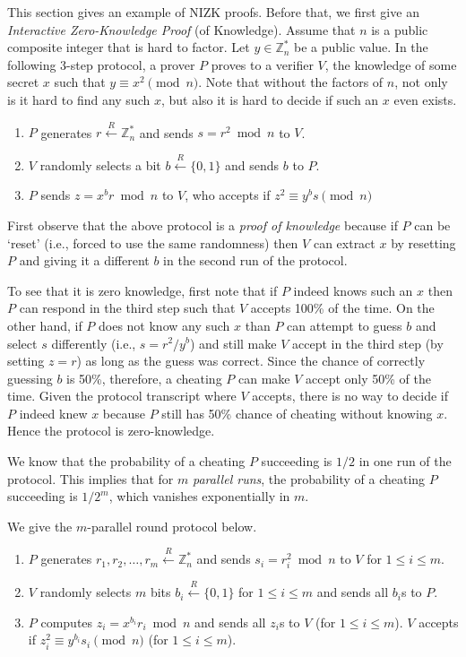 \documentclass[]{report}   %
\newcommand{\rand}{\stackrel{R}{\leftarrow}}
\begin{document}
This section gives an example of NIZK proofs. Before that, we first give an {\em Interactive Zero-Knowledge Proof} (of Knowledge). Assume that $n$ is a public composite integer that is hard to factor.
Let $y\in \mathbb{Z}^*_n$ be a public value. In the following 3-step protocol, a prover $P$ proves to a verifier $V$, the knowledge of some secret $x$ such that $y\equiv x^2 \pmod{n}$.
Note that without the factors of $n$, not only is it hard to find any such $x$, but also it is hard to decide if such an $x$ even exists. 

\begin{enumerate}
	\item $P$ generates $r\rand \mathbb{Z}^*_n$ and sends $s = r^2\bmod{n}$ to $V$.
	\item $V$ randomly selects a bit $b\rand \{0, 1\}$ and sends $b$ to $P$.
	\item $P$ sends $z=x^br \bmod{n}$ to $V$, who accepts if $z^2 \equiv y^bs\pmod{n}$
\end{enumerate}

First observe that the above protocol is a {\em proof of knowledge} because if $P$ can be `reset' (i.e., forced to use the same randomness) then $V$ can extract $x$ by resetting $P$ and giving it a different $b$ in the second run of the protocol. 

To see that it is zero knowledge, first note that if $P$ indeed knows such an $x$ then $P$ can respond in the third step such that $V$ accepts 100\% of the time. On the other hand, if $P$ does not know any such $x$ than $P$ can attempt to guess $b$ and select $s$ differently (i.e., $s=r^2/y^b$) and still make $V$ accept in the third step (by setting $z=r$) as long as the guess was correct. 
Since the chance of correctly guessing $b$ is 50\%, therefore, a cheating $P$ can make $V$ accept only 50\% of the time. 
Given the protocol transcript where $V$ accepts, there is no way to decide if $P$ indeed knew $x$ because $P$ still has 50\% chance of cheating without knowing $x$. Hence the protocol is zero-knowledge.

We know that the probability of a cheating $P$ succeeding is $1/2$ in one run of the protocol. This implies that for $m$ {\em parallel runs}, the probability of a cheating $P$ succeeding is $1/2^m$, which vanishes exponentially in $m$. 

We give the $m$-parallel round protocol below.

\begin{enumerate}
	\item $P$ generates $r_1, r_2, \ldots, r_m\rand \mathbb{Z}^*_n$ and sends $s_i = r_i^2\bmod{n}$ to $V$ for $1\leq i\leq m$.
	\item $V$ randomly selects $m$ bits $b_i\rand \{0, 1\}$  for $1\leq i\leq m$ and sends all $b_i$s to $P$.
	\item $P$ computes $z_i=x^{b_i}r_i \bmod{n}$ and sends all $z_i$s to $V$ (for $1\leq i\leq m$). $V$ accepts if $z_i^2 \equiv y^{b_i}s_i\pmod{n}$  (for $1\leq i\leq m$).
\end{enumerate}
\end{document}
